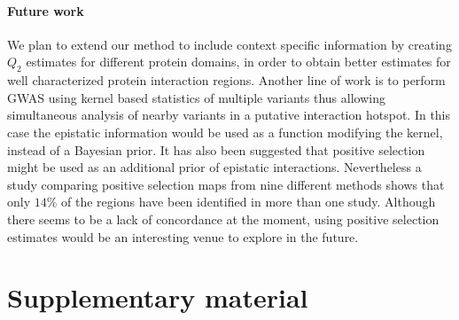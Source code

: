 \paragraph{Future work}
We plan to extend our method to include context specific information by creating $Q_2$ estimates for different protein domains, in order to obtain better estimates for well characterized protein interaction regions. 
Another line of work is to perform GWAS using kernel based statistics of multiple variants \cite{wu2011rare} thus allowing simultaneous analysis of nearby variants in a putative interaction hotspot. 
In this case the epistatic information would be used as a function modifying the kernel, instead of a Bayesian prior.
It has also been suggested that positive selection might be used as an additional prior of epistatic interactions. 
Nevertheless a study comparing positive selection maps from nine different methods \cite{akey2009constructing} shows that only $14\%$ of the regions have been identified in more than one study.
Although there seems to be a lack of concordance at the moment, using positive selection estimates would be an interesting venue to explore in the future.

\section{Supplementary material}
\FloatBarrier

